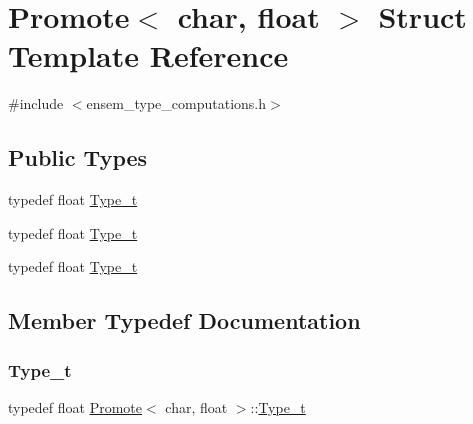 \hypertarget{structPromote_3_01char_00_01float_01_4}{}\section{Promote$<$ char, float $>$ Struct Template Reference}
\label{structPromote_3_01char_00_01float_01_4}


{\ttfamily \#include $<$ensem\+\_\+type\+\_\+computations.\+h$>$}

\subsection*{Public Types}
\begin{DoxyCompactItemize}
\item 
typedef float \mbox{\hyperlink{structPromote_3_01char_00_01float_01_4_a1b84f2980103f92d2d15d421d34d78ea}{Type\+\_\+t}}
\item 
typedef float \mbox{\hyperlink{structPromote_3_01char_00_01float_01_4_a1b84f2980103f92d2d15d421d34d78ea}{Type\+\_\+t}}
\item 
typedef float \mbox{\hyperlink{structPromote_3_01char_00_01float_01_4_a1b84f2980103f92d2d15d421d34d78ea}{Type\+\_\+t}}
\end{DoxyCompactItemize}


\subsection{Member Typedef Documentation}
\mbox{\label{structPromote_3_01char_00_01float_01_4_a1b84f2980103f92d2d15d421d34d78ea}} 
\subsubsection{\texorpdfstring{Type\_t}{Type\_t}\hspace{0.1cm}{\footnotesize\ttfamily [1/3]}}
{\footnotesize\ttfamily typedef float \mbox{\hyperlink{structPromote}{Promote}}$<$ char, float $>$\+::\mbox{\hyperlink{structPromote_3_01char_00_01float_01_4_a1b84f2980103f92d2d15d421d34d78ea}{Type\+\_\+t}}}

\mbox{\label{structPromote_3_01char_00_01float_01_4_a1b84f2980103f92d2d15d421d34d78ea}} 
